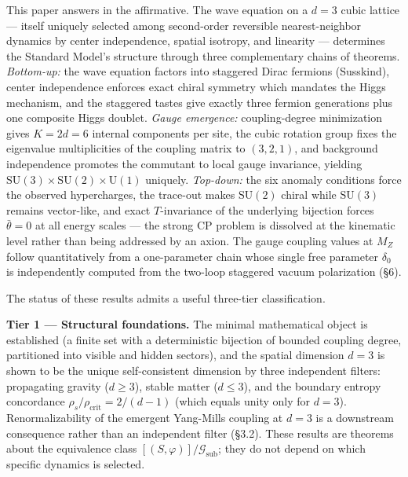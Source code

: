 \documentclass[
]{article}
\begin{document}
This paper answers in the affirmative. The wave equation on a \(d = 3\)
cubic lattice --- itself uniquely selected among second-order reversible
nearest-neighbor dynamics by center independence, spatial isotropy, and
linearity --- determines the Standard Model's structure through three
complementary chains of theorems. \emph{Bottom-up:} the wave equation
factors into staggered Dirac fermions (Susskind), center independence
enforces exact chiral symmetry which mandates the Higgs mechanism, and
the staggered tastes give exactly three fermion generations plus one
composite Higgs doublet. \emph{Gauge emergence:} coupling-degree
minimization gives \(K = 2d = 6\) internal components per site, the
cubic rotation group fixes the eigenvalue multiplicities of the coupling
matrix to \((3, 2, 1)\), and background independence promotes the
commutant to local gauge invariance, yielding
\(\mathrm{SU}(3) \times \mathrm{SU}(2) \times \mathrm{U}(1)\) uniquely.
\emph{Top-down:} the six anomaly conditions force the observed
hypercharges, the trace-out makes \(\mathrm{SU}(2)\) chiral while
\(\mathrm{SU}(3)\) remains vector-like, and exact \(T\)-invariance of
the underlying bijection forces \(\bar\theta = 0\) at all energy scales
--- the strong CP problem is dissolved at the kinematic level rather
than being addressed by an axion. The gauge coupling values at \(M_Z\)
follow quantitatively from a one-parameter chain whose single free
parameter \(\delta_0\) is independently computed from the two-loop
staggered vacuum polarization (§6).

The status of these results admits a useful three-tier classification.

\textbf{Tier 1 --- Structural foundations.} The minimal mathematical
object is established (a finite set with a deterministic bijection of
bounded coupling degree, partitioned into visible and hidden sectors),
and the spatial dimension \(d = 3\) is shown to be the unique
self-consistent dimension by three independent filters: propagating
gravity (\(d \geq 3\)), stable matter (\(d \leq 3\)), and the boundary
entropy concordance \(\rho_s/\rho_{\text{crit}} = 2/(d-1)\) (which
equals unity only for \(d = 3\)). Renormalizability of the emergent
Yang-Mills coupling at \(d = 3\) is a downstream consequence rather than
an independent filter (§3.2). These results are theorems about the
equivalence class \([(S, \varphi)]/\mathcal{G}_{\text{sub}}\); they do
not depend on which specific dynamics is selected.
\end{document}
